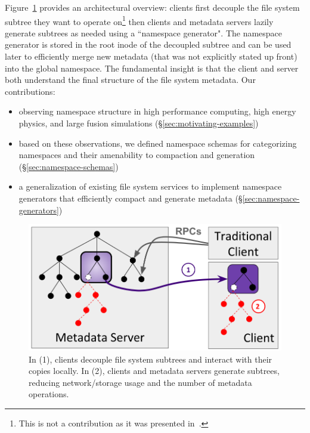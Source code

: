 Figure~\ref{fig:intro} provides an architectural overview: clients first
decouple the file system subtree they want to operate on\footnote{This is not a
contribution as it was presented in~\cite{sevilla:ipdps18-cudele}.} then
clients and metadata servers lazily generate subtrees as needed using a
``namespace generator". The namespace generator is stored in the root inode of
the decoupled subtree and can be used later to efficiently merge new metadata
(that was not explicitly stated up front) into the global namespace.  The
fundamental insight is that the client and server both understand the final
structure of the file system metadata. Our contributions:
\vspace{-0.5em}
\begin{itemize}
  \setlength\itemsep{-0.5em}

\item observing namespace structure in high performance computing, high energy
physics, and large fusion simulations (\S\ref{sec:motivating-examples})

\item based on these observations, we defined namespace schemas for
categorizing namespaces and their amenability to compaction and generation
(\S\ref{sec:namespace-schemas})

\item a generalization of existing file system services to implement namespace
generators that efficiently compact and generate metadata
(\S\ref{sec:namespace-generators}) \end{itemize}

\begin{figure}[t]
  \centering
  \includegraphics[width=0.8\linewidth]{./chapters/tintenfisch/figures/intro.png}
  \caption{In (1), clients decouple file system subtrees and interact with
their copies locally. In (2), clients and metadata servers generate subtrees,
reducing network/storage usage and the number of metadata operations.
\label{fig:intro}}
\end{figure}
